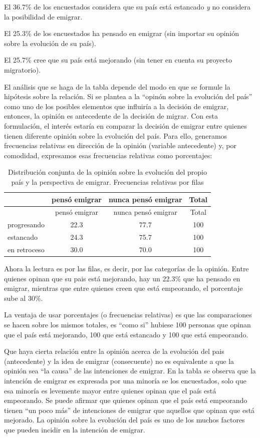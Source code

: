 \documentclass[]{book}
\begin{document}
El 36.7\% de los encuestados considera que su país está estancado \emph{y} no considera la posibilidad de emigrar.

El 25.3\% de los encuestados ha pensado en emigrar (sin importar su opinión sobre la evolución de su país).

El 25.7\% cree que su país está mejorando (sin tener en cuenta su proyecto migratorio).

El análisis que se haga de la tabla depende del modo en que se formule la hipótesis sobre la relación. Si se plantea a la ``opinón sobre la evolución del país'' como uno de los posibles elementos que influiría a la decisión de emigrar, entonces, la opinión es antecedente de la decisión de migrar. Con esta formulación, el interés estaría en comparar la decisión de emigrar entre quienes tienen diferente opinión sobre la evolución del país. Para ello, generamos frecuencias relativas en dirección de la opinión (variable antecedente) y, por comodidad, expresamos esas frecuencias relativas como porcentajes:

\begin{longtable}[]{@{}lccc@{}}
\caption{\label{tab:frecConj}Distribución conjunta de la opinión sobre la evolución del propio país y la perspectiva de emigrar. Frecuencias relativas por filas}\tabularnewline
\toprule
& pensó emigrar & nunca pensó emigrar & Total\tabularnewline
\midrule
\endfirsthead
\toprule
& pensó emigrar & nunca pensó emigrar & Total\tabularnewline
\midrule
\endhead
progresando & 22.3 & 77.7 & 100\tabularnewline
estancado & 24.3 & 75.7 & 100\tabularnewline
en retroceso & 30.0 & 70.0 & 100\tabularnewline
\bottomrule
\end{longtable}

Ahora la lectura es por las filas, es decir, por las categorías de la opinión. Entre quienes opinan que su pais está mejorando, hay un 22.3\% que ha pensado en emigrar, mientras que entre quienes creen que está empeorando, el porcentaje sube al 30\%.

La ventaja de usar porcentajes (o frecuencias relativas) es que las
comparaciones se hacen sobre los mismos totales, es ``como si'' hubiese
100 personas que opinan que el país está mejorando, 100 que está estancado y 100 que está empeorando.

Que haya cierta relación entre la opinión acerca de la evolución del pais (antecedente) y la idea de emigrar (consecuente) no es equivalente a que la opinión sea ``la causa'' de las intenciones de emigrar. En la tabla se observa que la intención de emigrar es expresada por una minoría se los encuestados, solo que esa minoría es levemente mayor entre quienes opinan que el país está empeorando. Se puede afirmar que quienes opinan que el país está empeorando tienen ``un poco más'' de intenciones de emigrar que aquellos que opinan que está mejorado. La opinión sobre la evolución del país es uno de los muchos factores que pueden incidir en la intención de emigrar.
\end{document}
